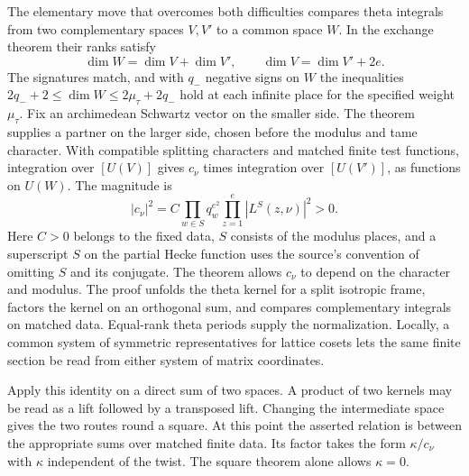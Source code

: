 The elementary move that overcomes both difficulties compares theta integrals from two complementary spaces $V,V'$ to a common space $W$. In the exchange theorem their ranks satisfy
\[
 \dim W=\dim V+\dim V',\qquad \dim V=\dim V'+2e .
\]
The signatures match, and with $q_-$ negative signs on $W$ the inequalities $2q_-+2\le\dim W\le2\mu_\tau+2q_-$ hold at each infinite place for the specified weight $\mu_\tau$. Fix an archimedean Schwartz vector on the smaller side. The theorem supplies a partner on the larger side, chosen before the modulus and tame character. With compatible splitting characters and matched finite test functions, integration over $[U(V)]$ gives $c_\nu$ times integration over $[U(V')]$, as functions on $U(W)$. The magnitude is
\[
 |c_\nu|^2=C\prod_{w\in S} q_w^{e^2}
                  \prod_{z=1}^{e}|L^S(z,\nu)|^2>0 .
\]
Here $C>0$ belongs to the fixed data, $S$ consists of the modulus places, and a superscript $S$ on the partial Hecke function uses the source's convention of omitting $S$ and its conjugate. The theorem allows $c_\nu$ to depend on the character and modulus. The proof unfolds the theta kernel for a split isotropic frame, factors the kernel on an orthogonal sum, and compares complementary integrals on matched data. Equal-rank theta periods supply the normalization. Locally, a common system of symmetric representatives for lattice cosets lets the same finite section be read from either system of matrix coordinates.

Apply this identity on a direct sum of two spaces. A product of two kernels may be read as a lift followed by a transposed lift. Changing the intermediate space gives the two routes round a square. At this point the asserted relation is between the appropriate sums over matched finite data. Its factor takes the form $\kappa/c_\nu$ with $\kappa$ independent of the twist. The square theorem alone allows $\kappa=0$.

